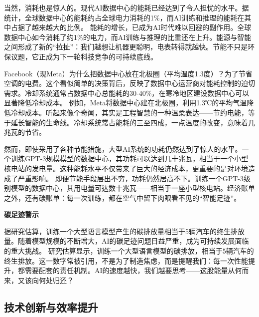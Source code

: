 当然，消耗也是惊人的。现代AI数据中心的能耗已经达到了令人担忧的水平。据统计，全球数据中心的能耗约占全球电力消耗的1\%，而AI训练和推理的能耗在其中占据了越来越大的比例。
能耗的增长，已成为AI时代难以回避的副作用。全球数据中心如今消耗了约1\%的电力，而AI训练与推理的比重还在上升。能源与智能之间形成了新的“拉扯”：我们越想让机器更聪明，电表转得就越快。节能不只是环保议题，它正成为下一轮科技竞争的可持续底线。

Facebook（现Meta）为什么把数据中心放在北极圈（平均温度1.3度）？为了节省空调的电费。这个看似简单的决策背后，反映了数据中心运营商对能耗控制的迫切需求。冷却系统通常占数据中心总能耗的30-40\%，在寒冷地区建设数据中心可以显著降低冷却成本。
例如，Meta将数据中心建在北极圈，利用1.3℃的平均气温降低冷却成本。听起来像个奇闻，其实是工程智慧的一种温柔表达——节约电能，等于延长智能的生命线。冷却系统常占能耗的三至四成，一点温度的改变，意味着几兆瓦的节省。

然而，即使采用了各种节能措施，大型AI系统的功耗仍然达到了惊人的水平。一个训练GPT-3规模模型的数据中心，其功耗可以达到几十兆瓦，相当于一个小型核电站的发电量。这种能耗水平不仅带来了巨大的经济成本，更重要的是对环境造成了严重影响。
即便节能手段层出不穷，功耗仍然居高不下。训练一个GPT-3级别模型的数据中心，其用电量可达数十兆瓦——相当于一座小型核电站。经济账单之外，还有碳账单：每一次训练，都在空气中留下肉眼看不见的“智能足迹”。

{\bf 碳足迹警示}

据研究估算，训练一个大型语言模型产生的碳排放量相当于5辆汽车的终生排放量。随着模型规模的不断增大，AI的碳足迹问题日益严重，成为可持续发展面临的重大挑战。
研究估算显示，训练一个大型语言模型的碳排放，相当于5辆汽车的终生排放。这一数字常被引用，不是为了制造焦虑，而是提醒我们：每一次性能提升，都需要配套的责任机制。AI的速度越快，我们越要思考——这股能量从何而来，又该向何处归还？

\subsection{技术创新与效率提升}

